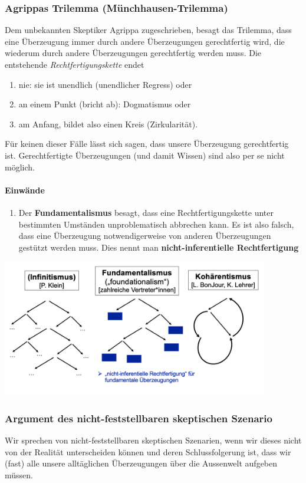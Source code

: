 \documentclass[../main.tex]{subfiles}
\begin{document}
\subsubsection{Agrippas Trilemma (Münchhausen-Trilemma)}
Dem unbekannten Skeptiker Agrippa zugeschrieben, besagt das Trilemma, dass eine Überzeugung immer durch andere Überzeugungen gerechtfertig wird, die wiederum durch andere Überzeugungen gerechtfertig werden muss. Die entstehende \textit{Rechtfertigungskette} endet 
\begin{enumerate}
	\item nie: sie ist unendlich (unendlicher Regress) oder 
	\item an einem Punkt (bricht ab): Dogmatismus oder
	\item am Anfang, bildet also einen Kreis (Zirkularität).
\end{enumerate}
Für keinen dieser Fälle lässt sich sagen, dass unsere Überzeugung gerechtfertig ist. Gerechtfertigte Überzeugungen (und damit Wissen) sind also per se nicht möglich. 
\paragraph{Einwände}
\begin{enumerate}
	\item Der \textbf{Fundamentalismus} besagt, dass eine Rechtfertigungskette unter bestimmten Umständen unproblematisch abbrechen kann. Es ist also falsch, dass eine Überzeugung notwendigerweise von anderen Überzeugungen gestützt werden muss. Dies nennt man \textbf{nicht-inferentielle Rechtfertigung}
\end{enumerate}

{\centering\includegraphics[height=6cm]{images/argumentationsketten.png}\endcenter}

\subsubsection{Argument des nicht-feststellbaren skeptischen Szenario}
Wir sprechen von nicht-feststellbaren skeptischen Szenarien, wenn wir dieses nicht von der Realität unterscheiden können und deren Schlussfolgerung ist, dass wir (fast) alle unsere alltäglichen Überzeugungen über die Aussenwelt aufgeben müssen. 
\end{document}
